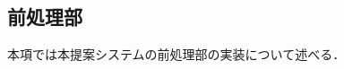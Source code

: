 \documentclass[shuuron]{kuee}
\begin{document}
\subsection{前処理部}

本項では本提案システムの前処理部の実装について述べる．











\end{document}
